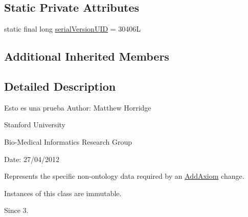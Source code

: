 \subsection*{Static Private Attributes}
\begin{DoxyCompactItemize}
\item 
static final long \hyperlink{classorg_1_1semanticweb_1_1owlapi_1_1change_1_1_add_axiom_data_a12c0209bc0077c3bc77d5b05eb472a57}{serial\-Version\-U\-I\-D} = 30406\-L
\end{DoxyCompactItemize}
\subsection*{Additional Inherited Members}


\subsection{Detailed Description}
Esto es una prueba Author\-: Matthew Horridge\par
 Stanford University\par
 Bio-\/\-Medical Informatics Research Group\par
 Date\-: 27/04/2012 

Represents the specific non-\/ontology data required by an \hyperlink{}{Add\-Axiom} change. 

Instances of this class are immutable. 

\begin{DoxySince}{Since}
3. 
\end{DoxySince}


